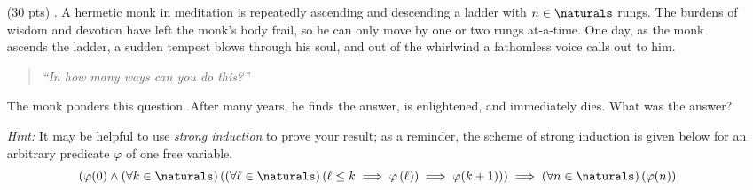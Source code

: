 \begin{enumerate}
  \item[(30 pts) \quad 5.]
    A hermetic monk in meditation is repeatedly ascending and descending a ladder with $n \in \naturals$ rungs.
    The burdens of wisdom and devotion have left the monk's body frail, so he can only move by one or two rungs at-a-time.
    One day, as the monk ascends the ladder, a sudden tempest blows through his soul, and out of the whirlwind a fathomless voice calls out to him.
    \begin{quote}
      \emph{``In how many ways can you do this?''}
    \end{quote}
    The monk ponders this question.
    After many years, he finds the answer, is enlightened, and immediately dies.
    What was the answer?

    \emph{Hint:} It may be helpful to use \emph{strong induction} to prove your result; as a reminder, the scheme of strong induction is given below for an arbitrary predicate $\varphi$ of one free variable.
      \begin{equation*}
        \left(\varphi(0) \land
          \left(\forall k \in \naturals\right)
          \left(\left(\forall \ell \in \naturals\right)
            \left(\ell \leq k \implies \varphi\left(\ell\right)\right)
        \implies \varphi(k + 1)\right)\right)
        \implies \left(\forall n \in \naturals\right)\left(\varphi(n)\right)
      \end{equation*}

\end{enumerate}


